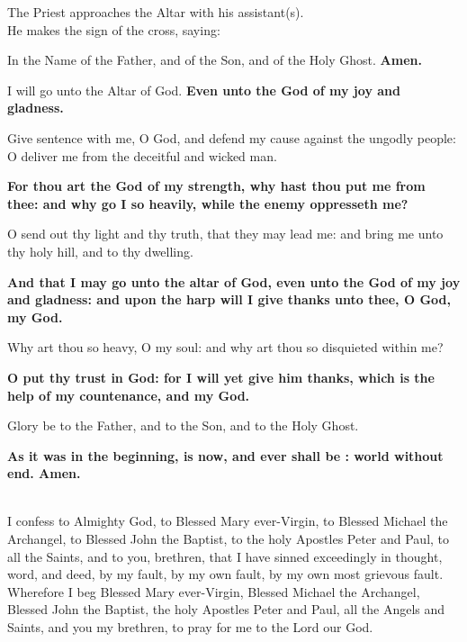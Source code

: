 
\begin{rubric}
The Priest approaches the Altar with his assistant(s).\\
He makes the sign of the cross, saying:
\end{rubric}

\cross In the Name of the Father, and of the Son, and of the Holy Ghost. \textbf{Amen.}

I will go unto the Altar of God.
\textbf{Even unto the God of my joy and gladness.}

Give sentence with me, O God, and defend my cause against the ungodly
people: O deliver me from the deceitful and wicked man.

\textbf{For thou art the God of my strength, why hast thou put me from thee:
and why go I so heavily, while the enemy oppresseth me?}

O send out thy light and thy truth, that they may lead me: and bring me unto thy holy hill, and to thy dwelling.

\textbf{And that I may go unto the altar of God, even unto the God of my joy
and gladness: and upon the harp will I give thanks unto thee, O God, my God.}

Why art thou so heavy, O my soul: and why art thou so disquieted within me?

\textbf{O put thy trust in God: for I will yet give him thanks, which is the help
of my countenance, and my God.}

Glory be to the Father, and to the Son, and to the Holy Ghost.

\textbf{As it was in the beginning, is now, and ever shall be : world without end. Amen.}


\newpage

\\
I confess to Almighty God, to Blessed Mary ever-Virgin, to Blessed Michael
the Archangel, to Blessed John the Baptist, to the holy Apostles Peter and
Paul, to all the Saints, and to you, brethren, that I have sinned exceedingly in
thought, word, and deed, by my fault, by my own fault, by my own most
grievous fault. Wherefore I beg Blessed Mary ever-Virgin, Blessed Michael
the Archangel, Blessed John the Baptist, the holy Apostles Peter and Paul, all
the Angels and Saints, and you my brethren, to pray for me to the Lord our
God.

